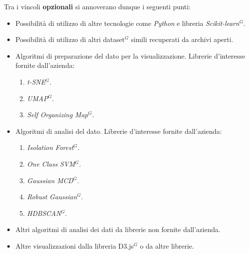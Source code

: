 \noindent Tra i vincoli \textbf{opzionali} si annoverano dunque i seguenti punti:
\begin{itemize}
\item Possibilità di utilizzo di altre tecnologie come \textit{Python} e libreria \textit{Scikit-learn$^{G}$}.
\item Possibilità di utilizzo di altri dataset$^{G}$ simili recuperati da archivi aperti.
\item Algoritmi di preparazione del dato per la visualizzazione. Librerie d'interesse fornite dall'azienda:
	\begin{enumerate}
                    \item \textit{t-SNE$^{G}$}.
                    \item \textit{UMAP$^{G}$}.
                    \item \textit{Self Organizing Map$^{G}$}.
	\end{enumerate}
\item Algoritmi di analisi del dato. Librerie d'interesse fornite dall'azienda:
	\begin{enumerate}
                    \item \textit{Isolation Forest$^{G}$}.
                    \item \textit{One Class SVM$^{G}$}.
                    \item \textit{Gaussian MCD$^{G}$}.
                    \item \textit{Robust Gaussian$^{G}$}.
                    \item \textit{HDBSCAN$^{G}$}.
	\end{enumerate}
\item Altri algoritmi di analisi dei dati da librerie non fornite dall’azienda.
\item Altre visualizzazioni dalla libreria D3.js$^{G}$ o da altre librerie.
\end{itemize}
